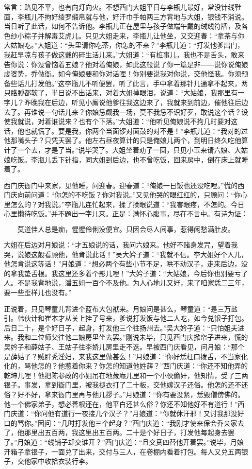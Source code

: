 常言：路见不平，也有向灯向火。不想西门大姐平日与李瓶儿最好，常没针线鞋面，李瓶儿不拘好绫罗缎帛就与他，好汗巾手帕两三方背地与大姐，银钱不消说。当日听了此话，如何不告诉他。李瓶儿正在屋里与孩子做端午戴的绒线符牌，及各色纱小粽子并解毒艾虎儿。只见大姐走来，李瓶儿让他坐，又交迎春：“拿茶与你大姑娘吃。”大姐道：“头里请你吃茶，你怎的不来？”李瓶儿道：“打发他爹出门，我赶早凉与孩子做这戴的碎生活儿来。”大姐道：“有桩事儿，我也不是舌头，敢来告你说：你没曾恼着五娘？他对着俺娘，如此这般说了你一篇是非——说你说俺娘虔婆势，乔做衙。如今俺娘要和你对话哩！你别要说我对你说，交他怪我。你须预备些话儿打发他。”这李瓶儿不听便罢，听了此言，手中拿着那针儿通拿不起来，两只胳膊都软了，半日说不出话来，对着大姐掉眼泪，说道：“大姑娘，我那里有一字儿？昨晚我在后边，听见小厮说他爹往我这边来了，我就来到前边，催他往后边去了。再谁说一句话儿来？你娘恁觑我一场，莫不我恁不识好歹，敢说这个话？设使我就说，对着谁说来？也有个下落。”大姐道：“他听见俺娘说不拘几时要对这话，他也就慌了。要是我，你两个当面锣对面鼓的对不是！”李瓶儿道：“我对的过他那嘴头子？只凭天罢了。他左右昼夜算计的只是俺娘儿两个，到明日终久吃他算计了一个去，才是了当。”说毕哭了。大姐坐着劝了一回，只见小玉来请六娘、大姑娘吃饭。李瓶儿丢下针指，同大姐到后边，也不曾吃饭，回来房中，倒在床上就睡着了。

西门庆衙门中来家，见他睡，问迎春。迎春道：“俺娘一日饭也还没吃哩。”慌的西门庆向前问道：“你怎的不吃饭？你对我说。”又见他哭的眼红红的，只顾问：“你心里怎么的？对我说。”李瓶儿连忙起来，揉了揉眼说道：“我害眼疼，不怎的。今日心里懒待吃饭。”并不题出一字儿来。正是：满怀心腹事，尽在不言中。有诗为证：

\[
莫道佳人总是痴，惺惺伶俐没便宜。
只因会尽人间事，惹得闲愁满肚皮。
\]

大姐在后边对月娘说：“才五娘说的话，我问六娘来。他好不赌身发咒，望着我哭，说娘这般看顾他，他肯说此话！”吴大妗子道：“我就不信。李大姐好个人儿，他怎肯说这等话！”月娘道：“想必两个有些小节不足，哄不动汉子，走来后边，没的拿我垫舌根。我这里还多着个影儿哩！”大妗子道：“大姑娘，今后你也别要亏了人。不是我背地说，潘五姐一百个不及他。为人心地儿又好，来了咱家恁二三年，要一些歪样儿也没有。”

正说着，只见琴童儿背进个蓝布大包袱来。月娘问是甚么，琴童道：“是三万盐引。韩伙计和崔本才从关上挂了号来，爹说打发饭与他二人吃，如今兑银子打包。后日二十，是个好日子，起身，打发他三个往扬州去。”吴大妗子道：“只怕姐夫进来。我和二位师父往他二娘房里坐去罢。”刚说未毕，只见西门庆掀帘子进来，慌的吴妗子和薛姑子、王姑子往李娇儿房里走不迭。早被西门庆看见，问月娘：“那个是薛姑子？贼胖秃淫妇，来我这里做甚么！”月娘道：“你好恁枉口拨舌，不当家化化的，骂他怎的？他惹着你来？你怎的知道他姓薛？”西门庆道：“你还不知他弄的乾坤儿哩！他把陈参政的小姐吊在地藏庵儿里和一个小伙偷奸，他知情，受了三两银子。事发，拿到衙门里，被我褪衣打了二十板，交他嫁汉子还俗。他怎的还不还俗？好不好，拿来衙门里再与他几拶子。”月娘道：“你有要没紧，恁毁僧傍佛的。他一个佛家弟子，想必善根还在，他平白还甚么俗？你还不知他好不有道行！”西门庆道：“你问他有道行一夜接几个汉子？”月娘道：“你就休汗邪！又讨我那没好口的骂你。”因问：“几时打发他三个起身？”西门庆道：“我刚才使来保会乔亲家去了，他那里出五百两，我这里出五百两。二十是个好日子，打发他每起身去罢了。”月娘道：“线铺子却交谁开？”西门庆道：“且交贲四替他开着罢。”说毕，月娘开箱子拿银子，一面兑了出来，交付与三人，在卷棚内看着打包。每人又兑五两银子，交他家中收拾衣装行李。


